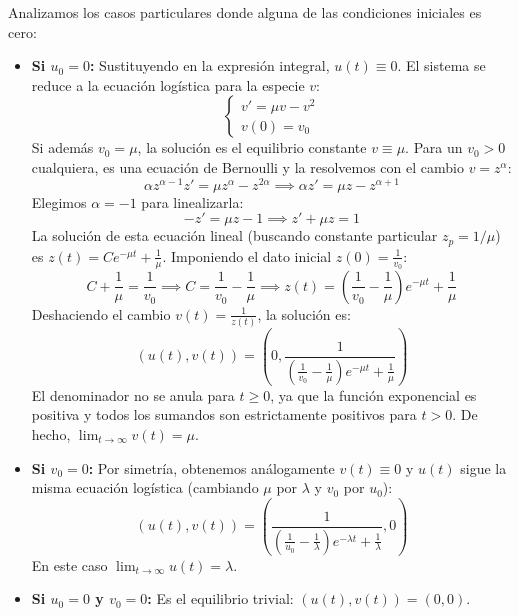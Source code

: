 {\begin{enumerate}[label=(\alph*)]
        Analizamos los casos particulares donde alguna de las condiciones iniciales es cero:
        \begin{itemize}
            \item \textbf{Si $u_0 = 0$:}
            Sustituyendo en la expresión integral, $u(t) \equiv 0$. El sistema se reduce a la ecuación logística para la especie $v$:
            \[
                \begin{cases}
                    v' = \mu v - v^2 \\
                    v(0) = v_0
                \end{cases}
            \]
            Si además $v_0 = \mu$, la solución es el equilibrio constante $v \equiv \mu$.
            Para un $v_0 > 0$ cualquiera, es una ecuación de Bernoulli y la resolvemos con el cambio $v = z^\alpha$:
            \[
                \alpha z^{\alpha-1} z' = \mu z^\alpha - z^{2\alpha} \implies \alpha z' = \mu z - z^{\alpha+1}
            \]
            Elegimos $\alpha = -1$ para linealizarla:
            \[
                -z' = \mu z - 1 \implies z' + \mu z = 1
            \]
            La solución de esta ecuación lineal (buscando constante particular $z_p = 1/\mu$) es $z(t) = C e^{-\mu t} + \frac{1}{\mu}$. Imponiendo el dato inicial $z(0) = \frac{1}{v_0}$:
            \[
                C + \frac{1}{\mu} = \frac{1}{v_0} \implies C = \frac{1}{v_0} - \frac{1}{\mu} \implies z(t) = \left( \frac{1}{v_0} - \frac{1}{\mu} \right) e^{-\mu t} + \frac{1}{\mu}
            \]
            Deshaciendo el cambio $v(t) = \frac{1}{z(t)}$, la solución es:
            \[
                (u(t), v(t)) = \left( 0, \frac{1}{\left( \frac{1}{v_0} - \frac{1}{\mu} \right) e^{-\mu t} + \frac{1}{\mu}} \right)
            \]
            El denominador no se anula para $t \ge 0$, ya que la función exponencial es positiva y todos los sumandos son estrictamente positivos para $t>0$. De hecho, $\lim_{t \to \infty} v(t) = \mu$.

            \item \textbf{Si $v_0 = 0$:}
            Por simetría, obtenemos análogamente $v(t) \equiv 0$ y $u(t)$ sigue la misma ecuación logística (cambiando $\mu$ por $\lambda$ y $v_0$ por $u_0$):
            \[
                (u(t), v(t)) = \left( \frac{1}{\left( \frac{1}{u_0} - \frac{1}{\lambda} \right) e^{-\lambda t} + \frac{1}{\lambda}}, 0 \right)
            \]
            En este caso $\lim_{t \to \infty} u(t) = \lambda$.
            
            \item \textbf{Si $u_0 = 0$ y $v_0 = 0$:}
            Es el equilibrio trivial: $(u(t), v(t)) = (0, 0)$.
        \end{itemize}


\end{enumerate}}
